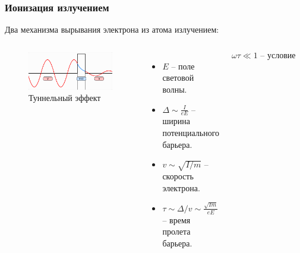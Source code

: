 \documentclass{beamer}
\begin{document}
	\begin{frame}
		\frametitle{Ионизация излучением}
		\vspace{-10pt}
		Два механизма вырывания электрона из атома излучением:
		\begin{columns}
			\begin{figure}
				\centering
				\includegraphics[width=\linewidth]{res/tunneling.png}
				\caption*{Туннельный эффект}
			\end{figure}
			\vspace{-10pt}
			\footnotesize
			\begin{itemize}
				\setlength\itemsep{-2pt}
				\item $E$ -- поле световой волны.
				\item $\Delta \sim \frac{I}{eE}$ -- ширина потенциального барьера.
				\item $v \sim \sqrt{I/m}$ -- скорость электрона.
				\item $\tau \sim \Delta / v \sim \frac{\sqrt{Im}}{eE}$ -- время пролета барьера.
			\end{itemize}
			$$\omega \tau \ll 1 \text{ -- условие статичности поля.}$$


\end{columns}
\end{frame}
\end{document}
